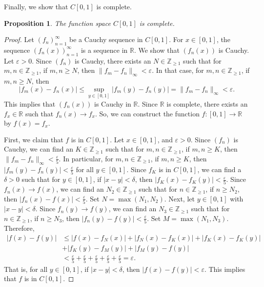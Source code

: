 \documentclass[a4paper, openany]{memoir}
\theoremstyle{definition}
\theoremstyle{plain}
\newtheorem{proposition}[definition]{Proposition}
\begin{document}
Finally, we show that $C[0, 1]$ is complete.
\begin{proposition}
    The function space $C[0, 1]$ is complete.
\end{proposition}
\begin{proof}
    Let $(f_n)_{n=1}^\infty$ be a Cauchy sequence in $C[0, 1]$. For $x \in [0, 1]$, the sequence $(f_n(x))_{n=1}^\infty$ is a sequence in $\mathbb{R}$. We show that $(f_n(x))$ is Cauchy. Let $\varepsilon > 0$. Since $(f_n)$ is Cauchy, there exists an $N \in \mathbb{Z}_{\geq 1}$ such that for $m, n \in \mathbb{Z}_{\geq 1}$, if $m, n \geq N$, then $\lVert f_m - f_n \rVert_\infty < \varepsilon$. In that case, for $m, n \in \mathbb{Z}_{\geq 1}$, if $m, n \geq N$, then 
    \[|f_m(x) - f_n(x)| \leq \sup_{y \in [0, 1]} |f_m(y) - f_n(y)| = \lVert f_m - f_n \rVert_\infty < \varepsilon.\]
    This implies that $(f_n(x))$ is Cauchy in $\mathbb{R}$. Since $\mathbb{R}$ is complete, there exists an $f_x \in \mathbb{R}$ such that $f_n(x) \to f_x$. So, we can construct the function $f: [0, 1] \to \mathbb{R}$ by $f(x) = f_x$.

    \noindent First, we claim that $f$ is in $C[0, 1]$. Let $x \in [0, 1]$, and $\varepsilon > 0$. Since $(f_n)$ is Cauchy, we can find an $K \in \mathbb{Z}_{\geq 1}$ such that for $m, n \in \mathbb{Z}_{\geq 1}$, if $m, n \geq K$, then $\lVert f_m - f_n \rVert_\infty < \frac{\varepsilon}{5}$. In particular, for $m, n \in \mathbb{Z}_{\geq 1}$, if $m, n \geq K$, then $|f_m(y) - f_n(y)| < \frac{\varepsilon}{5}$ for all $y \in [0, 1]$. Since $f_K$ is in $C[0, 1]$, we can find a $\delta > 0$ such that for $y \in [0, 1]$, if $|x - y| < \delta$, then $|f_K(x) - f_K(y)| < \frac{\varepsilon}{5}$. Since $f_n(x) \to f(x)$, we can find an $N_2 \in \mathbb{Z}_{\geq 1}$ such that for $n \in \mathbb{Z}_{\geq 1}$, if $n \geq N_2$, then $|f_n(x) - f(x)| < \frac{\varepsilon}{5}$. Set $N = \max(N_1, N_2)$. Next, let $y \in [0, 1]$ with $|x - y| < \delta$. Since $f_n(y) \to f(y)$, we can find an $N_3 \in \mathbb{Z}_{\geq 1}$ such that for $n \in \mathbb{Z}_{\geq 1}$, if $n \geq N_3$, then $|f_n(y) - f(y)| < \frac{\varepsilon}{5}$. Set $M = \max(N_1, N_3)$. Therefore,
    \begin{align*}
        |f(x) - f(y)| &\leq |f(x) - f_N(x)| + |f_N(x) - f_K(x)| + |f_K(x) - f_K(y)| \\
        &+ |f_K(y) - f_M(y)| + |f_M(y) - f(y)| \\
        &< \frac{\varepsilon}{5} + \frac{\varepsilon}{5} + \frac{\varepsilon}{5} + \frac{\varepsilon}{5} + \frac{\varepsilon}{5} = \varepsilon.
    \end{align*}
    That is, for all $y \in [0, 1]$, if $|x - y| < \delta$, then $|f(x) - f(y)| < \varepsilon$. This implies that $f$ is in $C[0, 1]$.


\end{proof}
\end{document}
